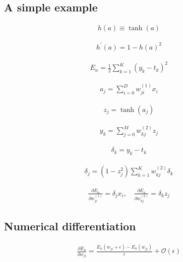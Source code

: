 \documentclass{article}
\begin{document}
\subsection{A simple example}

\begin{align*}
h(a) \equiv \tanh(a) \tag{8.15}
\end{align*}

\begin{align*}
h^{\prime}(a) = 1 - h(a)^{2} \tag{8.16}
\end{align*}

\begin{align*}
E_{n} = \frac{1}{2} \sum_{k=1}^{K} \left( y_{k} - t_{k} \right)^{2} \tag{8.17}
\end{align*}

\begin{align*}
a_{j} = \sum_{i=0}^{D} w_{j i}^{(1)} x_{i} \tag{8.18}
\end{align*}

\begin{align*}
z_{j} = \tanh(a_{j}) \tag{8.19}
\end{align*}

\begin{align*}
y_{k} = \sum_{j=0}^{M} w_{k j}^{(2)} z_{j} \tag{8.20}
\end{align*}

\begin{align*}
\delta_{k} = y_{k} - t_{k} \tag{8.21}
\end{align*}

\begin{align*}
\delta_{j} = \left( 1 - z_{j}^{2} \right) \sum_{k=1}^{K} w_{k j}^{(2)} \delta_{k} \tag{8.22}
\end{align*}

\begin{align*}
\frac{\partial E_{n}}{\partial w_{j i}^{(1)}} = \delta_{j} x_{i}, \quad \frac{\partial E_{n}}{\partial w_{k j}^{(2)}} = \delta_{k} z_{j} \tag{8.23}
\end{align*}

\subsection{Numerical differentiation}

\begin{align*}
\frac{\partial E_{n}}{\partial w_{j i}} = \frac{E_{n}(w_{j i} + \epsilon) - E_{n}(w_{j i})}{\epsilon} + \mathcal{O}(\epsilon) \tag{8.24}
\end{align*}
\end{document}
